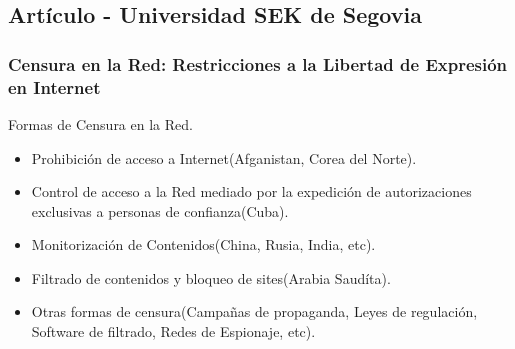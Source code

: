 \documentclass{beamer}
\begin{document}
\subsection{Art\'iculo - Universidad SEK de Segovia}
\frame
{
\transdissolve[duration=0.2]
\frametitle{Censura en la Red: Restricciones a la Libertad de Expresi\'on en Internet}
Formas de Censura en la Red.
\begin{itemize}
\item Prohibici\'on de acceso a Internet(Afganistan, Corea del Norte).
\item Control de acceso a la Red mediado por la expedici\'on de autorizaciones exclusivas a personas de confianza(Cuba).
\item Monitorizaci\'on de Contenidos(China, Rusia, India, etc).
\item Filtrado de contenidos y bloqueo de sites(Arabia Saud\'ita).
\item Otras formas de censura(Campa\~nas de propaganda, Leyes de regulaci\'on, Software de filtrado, Redes de Espionaje, etc).
\end{itemize}
}
\end{document}
